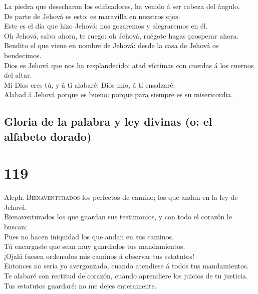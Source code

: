  La piedra que desecharon los edificadores, ha venido á
ser cabeza del ángulo.\\
 De parte de Jehová es esto: es maravilla en nuestros
ojos.\\
 Este es el día que hizo Jehová: nos gozaremos y
alegraremos en él.\\
 Oh Jehová, salva ahora, te ruego: oh Jehová, ruégote
hagas prosperar ahora.\\
 Bendito el que viene en nombre de Jehová: desde la casa
de Jehová os bendecimos.\\
 Dios es Jehová que nos ha resplandecido: atad víctimas
con cuerdas á los cuernos del altar.\\
 Mi Dios eres tú, y á ti alabaré: Dios mío, á ti
ensalzaré.\\
 Alabad á Jehová porque es bueno; porque para siempre es
su misericordia.

\hypertarget{gloria-de-la-palabra-y-ley-divinas-o-el-alfabeto-dorado}{%
\subsection{Gloria de la palabra y ley divinas (o: el alfabeto
dorado)}\label{gloria-de-la-palabra-y-ley-divinas-o-el-alfabeto-dorado}}

\hypertarget{section-19-119}{%
\section{119}\label{section-19-119}}

 Aleph. \textsc{Bienaventurados} los perfectos de camino;
los que andan en la ley de Jehová.\\
 Bienaventurados los que guardan sus testimonios, y con
todo el corazón le buscan:\\
 Pues no hacen iniquidad los que andan en sus caminos.\\
 Tú encargaste que sean muy guardados tus mandamientos.\\
 ¡Ojalá fuesen ordenados mis caminos á observar tus
estatutos!\\
 Entonces no sería yo avergonzado, cuando atendiese á
todos tus mandamientos.\\
 Te alabaré con rectitud de corazón, cuando aprendiere los
juicios de tu justicia.\\
 Tus estatutos guardaré: no me dejes enteramente.

